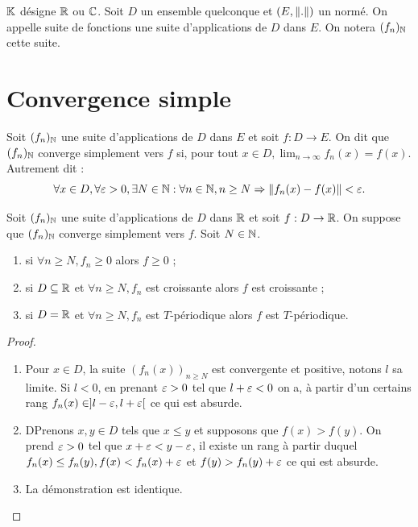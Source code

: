 \documentclass{article}
\begin{document}
$\mathbb{K}$ désigne $\mathbb{R}$ ou $\mathbb{C}$.
Soit $D$ un ensemble quelconque et $(E, \lVert.\rVert)$ un \Kev normé. 
On appelle suite de fonctions une suite d'applications de $D$ dans $E$.
On notera $(f_n)_{\mathbb{N}}$ cette suite.

\section{Convergence simple}

\begin{defn}
Soit $(f_n)_{\mathbb{N}}$ une suite d'applications de $D$ dans $E$ et soit $f:D \to E$. On dit que $(f_n)_{\mathbb{N}}$ converge simplement vers $f$ si,
pour tout $x \in D, \lim_{n \to \infty} f_n(x) = f(x)$. Autrement dit :
\[ \forall x \in D, \forall \varepsilon > 0, \exists N \in \mathbb{N} : \forall n \in \mathbb{N}, n \geq N \Rightarrow \lVert f_n(x)-f(x)\rVert < \varepsilon . \]
\end{defn}

\begin{thm}
Soit $(f_n)_{\mathbb{N}}$ une suite d'applications de $D$ dans $\mathbb{R}$ et soit $f:D \to \mathbb{R}$. On suppose que $(f_n)_{\mathbb{N}}$ converge simplement vers $f$.
Soit $N \in \mathbb{N}$.
\begin{enumerate}[label=(\roman*)]
\item si $\forall n \geq N, f_n \geq 0$ alors $f \geq 0$ ;
\item si $D \subseteq \mathbb{R}$ et $\forall n \geq N, f_n$ est croissante alors $f$ est croissante ;
\item si $D = \mathbb{R}$ et $ \forall n \geq N, f_n$ est $T$-périodique alors $f$ est $T$-périodique.
\end{enumerate}
\end{thm}

\begin{proof}
\begin{enumerate}[label=(\roman*)]
\item Pour $x \in D$, la suite $(f_n(x))_{n \geq N}$ est convergente et positive, notons $l$ sa limite. Si $l <0$, en prenant $\varepsilon > 0 $ tel que
$l + \varepsilon < 0$ on a, à partir d'un certains rang $f_n(x) \in ]l-\varepsilon, l + \varepsilon [$ ce qui est absurde.
\item DPrenons $x, y \in D$ tels que $x \leq y$ et supposons que $f(x) > f(y)$. On prend $\varepsilon > 0$ tel que $x + \varepsilon < y - \varepsilon$, 
il existe un rang à partir duquel $f_n(x) \leq f_n(y), f(x) < f_n(x) + \varepsilon$ et $f(y) > f_n(y) + \varepsilon$ ce qui est absurde.
\item La démonstration est identique.
\end{enumerate}
\end{proof}
\end{document}
